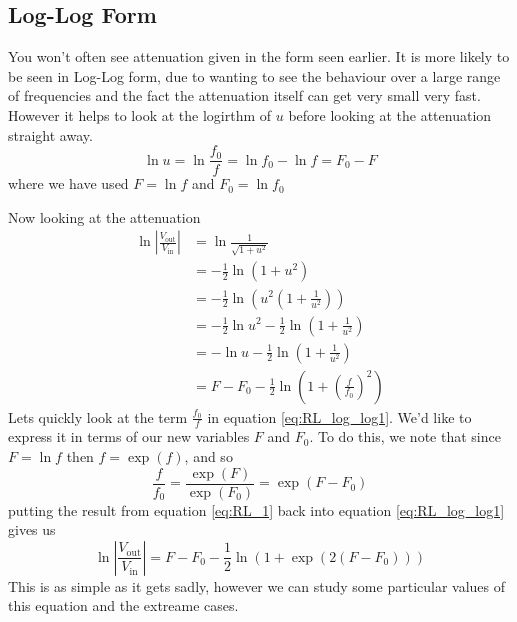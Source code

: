 \subsection{Log-Log Form}
You won't often see attenuation given in the form seen earlier. It is more likely
to be seen in Log-Log form, due to wanting to see the behaviour over a large range
of frequencies and the fact the attenuation itself can get very small very fast.
However it helps to look at the logirthm of $u$ before looking at the attenuation
straight away.
\begin{equation}
  \ln u = \ln \frac{f_0}{f} = \ln f_0 - \ln f = F_0 - F
\end{equation}
where we have used $F=\ln f$ and $F_0 = \ln f_0 $

Now looking at the attenuation
\begin{align}
  \ln \left|\frac{V_{\text{out}}}{V_{\text{in}}} \right| & = \ln \frac{1}{\sqrt{1+u^2}} \nonumber \\
  &= -\frac{1}{2} \ln \left(1+u^2\right) \nonumber \\
  &= -\frac{1}{2} \ln \left(u^2\left(1+\frac{1}{u^2}\right)\right) \nonumber \\
  &= -\frac{1}{2} \ln u^2 -\frac{1}{2} \ln\left(1+\frac{1}{u^2}\right) \nonumber \\
  &= -\ln u -\frac{1}{2} \ln\left(1+\frac{1}{u^2}\right) \nonumber \\
  &= F - F_0  -\frac{1}{2} \ln\left(1+\left(\frac{f}{f_0}\right)^2\right) \label{eq:RL_log_log1}
\end{align}
Lets quickly look at the term $\frac{f_0}{f}$ in equation \ref{eq:RL_log_log1}.
We'd like to express it in terms of our new variables $F$ and $F_0$. To do this,
we note that since $F = \ln f$ then $f = \exp(f)$, and so
\begin{equation}
  \frac{f}{f_0} = \frac{\exp(F)}{\exp(F_0)} = \exp( F - F_0 ) \label{eq:RL_1}
\end{equation}
putting the result from equation \ref{eq:RL_1} back into equation  \ref{eq:RL_log_log1}
gives us
\begin{equation}
  \ln \left|\frac{V_{\text{out}}}{V_{\text{in}}} \right| = F - F_0  -\frac{1}{2} \ln\left(1+\exp( 2(F - F_0) )\right) \label{eq:RL_log_log2}
\end{equation}
This is as simple as it gets sadly, however we can study some particular values
of this equation and the extreame cases.
